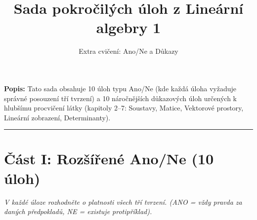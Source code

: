 \documentclass[a4paper,11pt]{article}
\title{\textbf{Sada pokročilých úloh z Lineární algebry 1}}
\author{Extra cvičení: Ano/Ne a Důkazy}
\date{}
\begin{document}
\maketitle

\noindent \textbf{Popis:} Tato sada obsahuje 10 úloh typu Ano/Ne (kde každá úloha vyžaduje správné posouzení tří tvrzení) a 10 náročnějších důkazových úloh určených k hlubšímu procvičení látky (kapitoly 2--7: Soustavy, Matice, Vektorové prostory, Lineární zobrazení, Determinanty).

\hrule
\vspace{0.5cm}

\section*{Část I: Rozšířené Ano/Ne (10 úloh)}
\textit{V každé úloze rozhodněte o platnosti všech tří tvrzení. (ANO = vždy pravda za daných předpokladů, NE = existuje protipříklad).}
\end{document}

